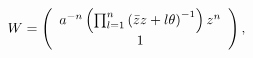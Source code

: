 \begin{equation}
W=\left(
\begin{array}
[c]{c}%
a^{-n}\left( \prod_{l=1}^{n}\left( \bar{z}z+l\theta\right) ^{-1}\right)
z^{n}\\
1
\end{array}
\right) , \label{w2}%
\end{equation}

